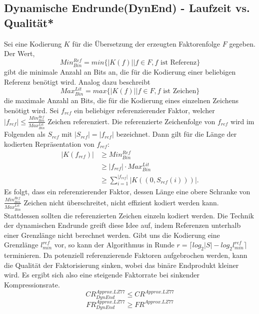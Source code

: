 \subsection{Dynamische Endrunde(DynEnd) - Laufzeit vs. Qualität*}
Sei eine Kodierung $K$ für die Übersetzung der erzeugten Faktorenfolge $F$ gegeben. Der Wert,
\begin{equation}
    Min^{Ref}_{Bin}=min\{|K(f)| | f \in F ,f \text{ ist Referenz}\}
\end{equation}
gibt die minimale Anzahl an Bits an, die für die Kodierung einer beliebigen Referenz benötigt wird. Analog dazu beschreibt
\begin{equation}
    Max^{Lit}_{Bin}=max\{|K(f)| | f \in F, f \text{ ist Zeichen}\}
\end{equation}
die maximale Anzahl an Bits, die für die Kodierung eines einzelnen Zeichens benötigt wird. Sei $f_{ref}$ ein beliebiger referenzierender Faktor, welcher 
$|f_{ref}|\leq\frac{Min^{Ref}_{Bin}}{Max^{Lit}_{Bin}}$ Zeichen referenziert. Die referenzierte Zeichenfolge von $f_{ref}$ wird im Folgenden als $S_{ref}$ mit $|S_{ref}|=|f_{ref}|$ bezeichnet.
Dann gilt für die Länge der kodierten Repräsentation von $f_{ref}$:
\begin{equation}
\begin{split}
    |K(f_{ref})| & \geq Min^{Ref}_{Bin}\\
    & \geq |f_{ref}| \cdot Max^{Lit}_{Bin}\\
    & \geq \sum_{i=1}^{|f_{ref}|} |K((0, S_{ref}(i)))|.
\end{split}
\end{equation}
Es folgt, dass ein referenzierender Faktor, dessen Länge eine obere Schranke von $\frac{Min^{Ref}_{Bin}}{Max^{Lit}_{Bin}}$ Zeichen nicht überschreitet, nicht effizient kodiert werden kann.
Stattdessen sollten die referenzierten Zeichen einzeln kodiert werden. Die Technik der dynamischen Endrunde greift diese Idee auf, indem Referenzen unterhalb einer Grenzlänge nicht berechnet
werden. Gibt uns die Kodierung eine Grenzlänge $l^{ref}_{min}$ vor, so kann der Algorithmus in Runde $r = \lceil log_2{|S|}-log_2{l^{ref}_{min}} \rceil$ terminieren. Da potenziell 
referenzierende Faktoren aufgebrochen werden, kann die Qualität der Faktorisierung sinken, wobei das binäre Endprodukt kleiner wird. Es ergibt sich also eine steigende Faktorrate bei
sinkender Kompressionsrate.
\begin{equation}
    CR^{Approx.LZ77}_{DynEnd} \leq CR^{Approx.LZ77}
\end{equation}
\begin{equation}
    FR^{Approx.LZ77}_{DynEnd} \geq FR^{Approx.LZ77}
\end{equation}

